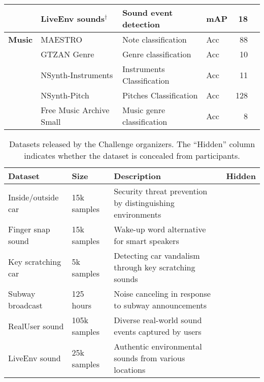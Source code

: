 \documentclass{article}
\newcommand{\cmark}{\ding{51}}%
\newcommand{\xmark}{\ding{55}}%
\begin{document}
\begin{table*}[htb]
\begin{tabularx}{\textwidth}{Xlllrc}
                     & LiveEnv sounds$^{\dagger}$                                   & Sound event detection             & mAP               & 18                 & \xmark \\
\midrule                
\textbf{Music}       & MAESTRO \cite{hawthorne2018enabling}                         & Note classification               & Acc               & 88                 & \cmark \\
                     & GTZAN Genre \cite{sturm2013gtzan}                            & Genre classification              & Acc               & 10                 & \cmark \\
                     & NSynth-Instruments \cite{nsynth2017}                         & Instruments Classification        & Acc               & 11                 & \cmark \\
                     & NSynth-Pitch \cite{nsynth2017}                               & Pitches Classification            & Acc               & 128                & \cmark \\
                     & Free Music Archive Small \cite{defferrard2016fma}            & Music genre classification        & Acc               & 8                  & \cmark \\
\bottomrule
\end{tabularx}
\end{table*}

\begin{table}[tb]
\centering
\caption{Datasets released by the Challenge organizers. The ``Hidden'' column indicates whether the dataset is concealed from participants.}
\vspace{0.5em}
\label{tab:organizer_datasets}
\begin{tabular}{lllc}
\toprule
\textbf{Dataset}           & \textbf{Size}  & \textbf{Description} & \textbf{Hidden}  \\
\midrule
Inside/outside car         & 15k samples    & Security threat prevention by distinguishing environments & \xmark\\
Finger snap sound          & 15k samples    & Wake-up word alternative for smart speakers               & \xmark\\
Key scratching car         & 5k samples     & Detecting car vandalism through key scratching sounds     & \xmark\\
Subway broadcast           & 125 hours      & Noise canceling in response to subway announcements       & \cmark\\
RealUser sound             & 105k samples   & Diverse real-world sound events captured by users         & \cmark\\
LiveEnv sound              & 25k samples    & Authentic environmental sounds from various locations     & \cmark\\
\bottomrule    
\end{tabular}
\end{table}
\end{document}
